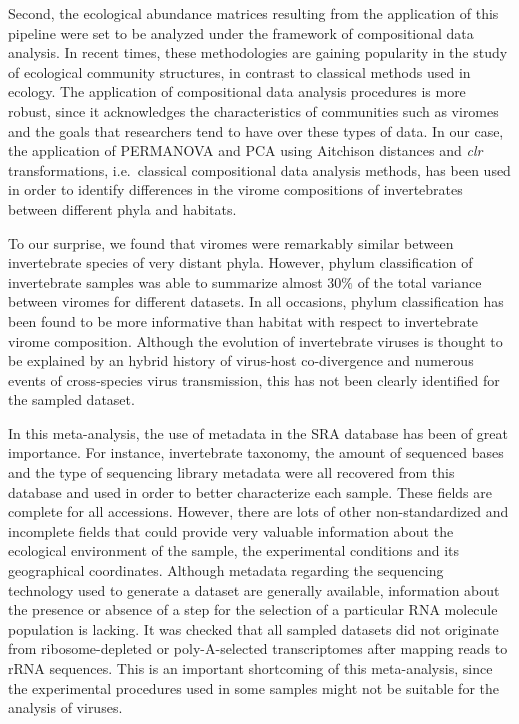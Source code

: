 \documentclass[
  openany]{book}
\begin{document}
Second, the ecological abundance matrices resulting from the application of this pipeline were set to be analyzed under the framework of compositional data analysis. In recent times, these methodologies are gaining popularity in the study of ecological community structures, in contrast to classical methods used in ecology. The application of compositional data analysis procedures is more robust, since it acknowledges the characteristics of communities such as viromes and the goals that researchers tend to have over these types of data. In our case, the application of PERMANOVA and PCA using Aitchison distances and \emph{clr} transformations, i.e.~classical compositional data analysis methods, has been used in order to identify differences in the virome compositions of invertebrates between different phyla and habitats.

To our surprise, we found that viromes were remarkably similar between invertebrate species of very distant phyla. However, phylum classification of invertebrate samples was able to summarize almost \(30\%\) of the total variance between viromes for different datasets. In all occasions, phylum classification has been found to be more informative than habitat with respect to invertebrate virome composition. Although the evolution of invertebrate viruses is thought to be explained by an hybrid history of virus-host co-divergence and numerous events of cross-species virus transmission, this has not been clearly identified for the sampled dataset.

In this meta-analysis, the use of metadata in the SRA database has been of great importance. For instance, invertebrate taxonomy, the amount of sequenced bases and the type of sequencing library metadata were all recovered from this database and used in order to better characterize each sample. These fields are complete for all accessions. However, there are lots of other non-standardized and incomplete fields that could provide very valuable information about the ecological environment of the sample, the experimental conditions and its geographical coordinates. Although metadata regarding the sequencing technology used to generate a dataset are generally available, information about the presence or absence of a step for the selection of a particular RNA molecule population is lacking. It was checked that all sampled datasets did not originate from ribosome-depleted or poly-A-selected transcriptomes after mapping reads to rRNA sequences. This is an important shortcoming of this meta-analysis, since the experimental procedures used in some samples might not be suitable for the analysis of viruses.
\end{document}
